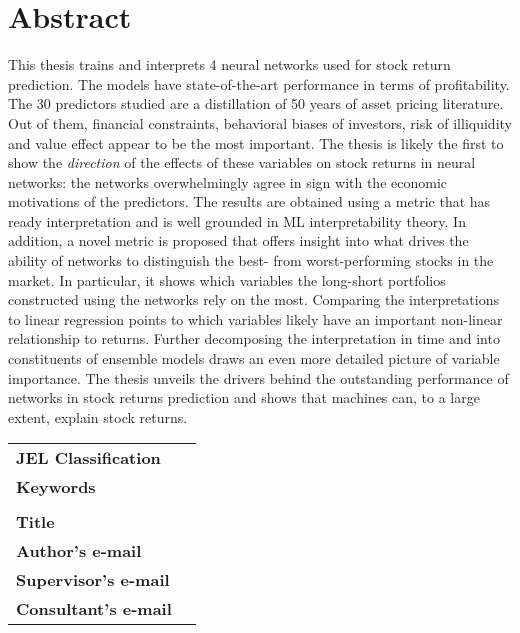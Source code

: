\section*{Abstract}

This thesis trains and interprets 4 neural networks used for stock return prediction. The models have state-of-the-art performance in terms of profitability. The 30 predictors studied are a distillation of 50 years of asset pricing literature. Out of them, financial constraints, behavioral biases of investors, risk of illiquidity and value effect appear to be the most important. The thesis is likely the first to show the \textit{direction} of the effects of these variables on stock returns in neural networks: the networks overwhelmingly agree in sign with the economic motivations of the predictors. The results are obtained using a metric that has ready interpretation and is well grounded in ML interpretability theory. In addition, a novel metric is proposed that offers insight into what drives the ability of networks to distinguish the best- from worst-performing stocks in the market. In particular, it shows which variables the long-short portfolios constructed using the networks rely on the most. Comparing the interpretations to linear regression points to which variables likely have an important non-linear relationship to returns. Further decomposing the interpretation in time and into constituents of ensemble models draws an even more detailed picture of variable importance. The thesis unveils the drivers behind the outstanding performance of networks in stock returns prediction and shows that machines can, to a large extent, explain stock returns. 

\bigskip

\begin{tabular}{lp{8.6cm}}
		\textbf{JEL Classification} & \JEL \\
		\textbf{Keywords} & \Keywords \\
 		& \\
		\textbf{Title} & \Bookname \\
 		\textbf{Author's e-mail} & \texttt{\href{mailto:\Email}{\Email}}\\
		\textbf{Supervisor's e-mail} & \texttt{\href{mailto:\EmailSup}{\EmailSup}}\\
		\textbf{Consultant's e-mail} & \texttt{\href{mailto:\EmailCon}{\EmailCon}}\\
\end{tabular}

\bigskip

